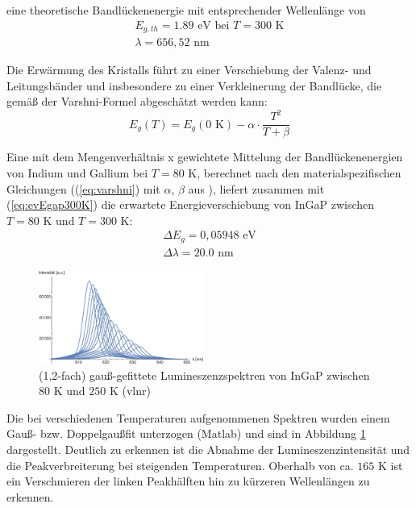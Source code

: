 \documentclass[aps,twocolumn,secnumarabic,nobalancelastpage,amsmath,amssymb,
nofootinbib,superscriptaddress]{revtex4-1}
\begin{document}
\noindent eine theoretische Bandlückenenergie mit entsprechender Wellenlänge von
\begin{eqnarray}
  E_{g,th} = 1.89\text{ eV}\text{ bei }T=300\text{ K}
  \\
  \nonumber
  \lambda = 656,52\text{ nm}\qquad\qquad\quad\;
  \label{eq:evEgap300K}
\end{eqnarray}

\noindent Die Erwärmung des Kristalls führt zu einer Verschiebung der Valenz- und Leitungsbänder und insbesondere
zu einer Verkleinerung der Bandlücke, die gemäß der Varshni-Formel abgeschätzt werden kann:
\begin{equation}
  E_g(T) = E_g(0\text{ K})-\alpha\cdot\frac{T^2}{T+\beta}
   \label{eq:varshni}
\end{equation}

\noindent Eine mit dem Mengenverhältnis x gewichtete Mittelung der Bandlückenenergien von Indium und Gallium bei $T=80\text{ K}$, berechnet nach den
materialspezifischen Gleichungen ((\ref{eq:varshni}) mit $\alpha$, $\beta$ aus \cite{vorbereitung}), liefert zusammen mit (\ref{eq:evEgap300K})
die erwartete Energieverschiebung von InGaP zwischen $T=80\text{ K}$ und $T=300\text{ K}$:
\begin{eqnarray}
  \Delta E_g = 0,05948\text{ eV}
  \\
  \nonumber
  \Delta\lambda = 20.0\text{ nm}\;\;\;\;\,\,
\label{eq:evVersch}
\end{eqnarray}


\begin{figure}[h!]
  \centering
  \includegraphics[width=0.48\textwidth]{../Messung/allfitsplot.eps}
  \caption{\label{fig:spek} (1,2-fach) gauß-gefittete Lumineszenzspektren von InGaP zwischen $80\text{ K}$ und $250\text{ K}$ (vlnr)}
\end{figure}

\noindent Die bei verschiedenen Temperaturen aufgenommenen Spektren wurden einem Gauß- bzw. Doppelgaußfit
unterzogen (Matlab) und sind in Abbildung \ref{fig:spek} dargestellt. Deutlich zu erkennen ist die Abnahme der
Lumineszenzintensität und die Peakverbreiterung bei steigenden Temperaturen. Oberhalb von ca. $165\text{ K}$
ist ein Verschmieren der linken Peakhälften hin zu kürzeren Wellenlängen zu erkennen.
\end{document}
